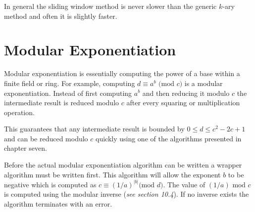 \documentclass[b5paper]{book}
\begin{document}
In general the sliding window method is never slower than the generic $k$-ary method and often it is slightly faster.  

\section{Modular Exponentiation}

Modular exponentiation is essentially computing the power of a base within a finite field or ring.  For example, computing 
$d \equiv a^b \mbox{ (mod }c\mbox{)}$ is a modular exponentiation.  Instead of first computing $a^b$ and then reducing it 
modulo $c$ the intermediate result is reduced modulo $c$ after every squaring or multiplication operation.  

This guarantees that any intermediate result is bounded by $0 \le d \le c^2 - 2c + 1$ and can be reduced modulo $c$ quickly using
one of the algorithms presented in chapter seven.  

Before the actual modular exponentiation algorithm can be written a wrapper algorithm must be written first.  This algorithm
will allow the exponent $b$ to be negative which is computed as $c \equiv \left (1 / a \right )^{\vert b \vert} \mbox{(mod }d\mbox{)}$. The
value of $(1/a) \mbox{ mod }c$ is computed using the modular inverse (\textit{see section 10.4}).  If no inverse exists the algorithm
terminates with an error.  
\end{document}
